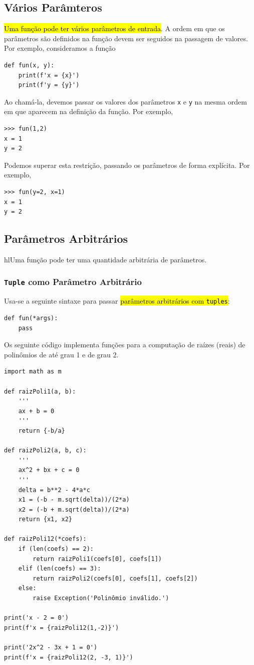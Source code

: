 \subsection{Vários Parâmteros}

\hl{Uma função pode ter vários parâmetros de entrada}. A ordem em que os parâmetros são definidos na função devem ser seguidos na passagem de valores. Por exemplo, consideramos a função
\begin{lstlisting}
def fun(x, y):
    print(f'x = {x}')
    print(f'y = {y}')
\end{lstlisting}
Ao chamá-la, devemos passar os valores dos parâmetros \lstinline+x+ e \lstinline+y+ na mesma ordem em que aparecem na definição da função. Por exemplo,
\begin{lstlisting}
>>> fun(1,2)
x = 1
y = 2
\end{lstlisting}
Podemos superar esta restrição, passando os parâmetros de forma explícita. Por exemplo,
\begin{lstlisting}
>>> fun(y=2, x=1)
x = 1
y = 2
\end{lstlisting}

\subsection{Parâmetros Arbitrários}

hl{Uma função pode ter uma quantidade arbitrária de parâmetros}.

\subsubsection{\lstinline+Tuple+ como Parâmetro Arbitrário}

Usa-se a seguinte sintaxe para passar \hl{parâmetros arbitrários com {\lstinline+tuples+}}:
\begin{lstlisting}
def fun(*args):
    pass
\end{lstlisting}

\begin{ex}
  Os seguinte código implementa funções para a computação de raízes (reais) de polinômios de até grau 1 e de grau 2.
\begin{lstlisting}
import math as m

def raizPoli1(a, b):
    '''
    ax + b = 0
    '''
    return {-b/a}

def raizPoli2(a, b, c):
    '''
    ax^2 + bx + c = 0
    '''
    delta = b**2 - 4*a*c
    x1 = (-b - m.sqrt(delta))/(2*a)
    x2 = (-b + m.sqrt(delta))/(2*a)
    return {x1, x2}

def raizPoli12(*coefs):
    if (len(coefs) == 2):
        return raizPoli1(coefs[0], coefs[1])
    elif (len(coefs) == 3):
        return raizPoli2(coefs[0], coefs[1], coefs[2])
    else:
        raise Exception('Polinômio inválido.')

print('x - 2 = 0')
print(f'x = {raizPoli12(1,-2)}')

print('2x^2 - 3x + 1 = 0')
print(f'x = {raizPoli12(2, -3, 1)}')
\end{lstlisting}
\end{ex}

